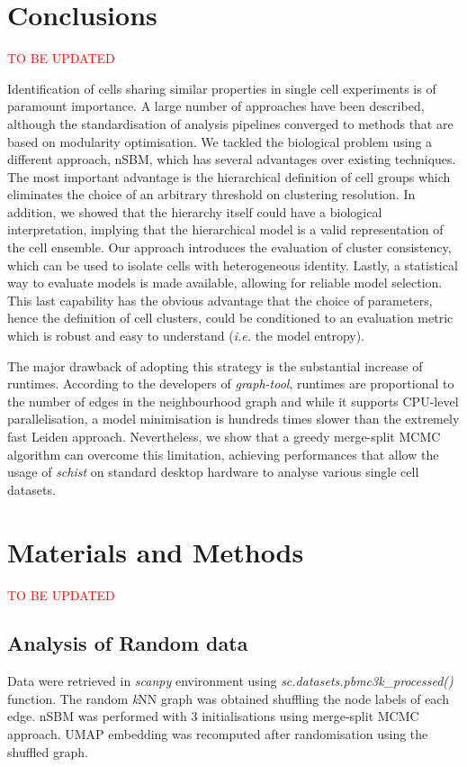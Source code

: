 \documentclass[10pt]{article}
\begin{document}
\section*{Conclusions}
\textcolor{red}{TO BE UPDATED}

Identification of cells sharing similar properties in single cell experiments is of paramount importance. A large number of approaches have been described, although the standardisation of analysis pipelines converged to methods that are based on modularity optimisation. We tackled the biological problem using a different approach, nSBM, which has several advantages over existing techniques. The most important advantage is the hierarchical definition of cell groups which eliminates the choice of an arbitrary threshold on clustering resolution. In addition, we showed that the hierarchy itself could have a biological interpretation, implying that the hierarchical model is a valid representation of the cell ensemble. Our approach introduces the evaluation of cluster consistency, which can be used to isolate cells with heterogeneous identity. Lastly, a statistical way to evaluate models is made available, allowing for reliable model selection. This last capability has the obvious advantage that the choice of parameters, hence the definition of cell clusters, could be conditioned to an evaluation metric which is robust and easy to understand (\emph{i.e.} the model entropy).

The major drawback of adopting this strategy is the substantial increase of runtimes. According to the developers of \emph{graph-tool}, runtimes are proportional to the number of edges in the neighbourhood graph and while it supports CPU-level parallelisation, a model minimisation is hundreds times slower than the extremely fast Leiden approach. Nevertheless, we show that a greedy merge-split MCMC algorithm can overcome this limitation, achieving performances that allow the usage of \emph{schist} on standard desktop hardware to analyse various single cell datasets.


\section*{Materials and Methods}

\textcolor{red}{TO BE UPDATED}

\subsection*{Analysis of Random data}
Data were retrieved in \emph{scanpy} environment using \emph{sc.datasets.pbmc3k\_processed()} function. The random \emph{k}NN graph was obtained shuffling the node labels of each edge. nSBM was performed with 3 initialisations using merge-split MCMC approach. UMAP embedding was recomputed after randomisation using the shuffled graph.
\end{document}
